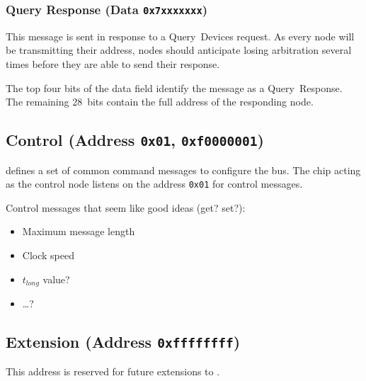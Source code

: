 \subsubsection{Query Response (Data \texttt{0x7xxxxxxx})}
This message is sent in response to a Query~Devices request. As every node
will be transmitting their address, nodes should anticipate losing arbitration
several times before they are able to send their response.

The top four bits of the data field identify the message as a Query~Response.
The remaining 28~bits contain the full address of the responding node.

\subsection{Control (Address \texttt{0x01}, \texttt{0xf0000001})}
\label{sec:control-control}
\bus defines a set of common command messages to configure the bus. The chip
acting as the control node listens on the address {\tt 0x01} for \bus control
messages.

Control messages that seem like good ideas (get? set?):
\begin{itemize}
  \item Maximum message length
  \item Clock speed
  \item $t_{long}$ value?
  \item \ldots?
\end{itemize}

\subsection{Extension (Address \texttt{0xffffffff})}
This address is reserved for future extensions to \bus.

